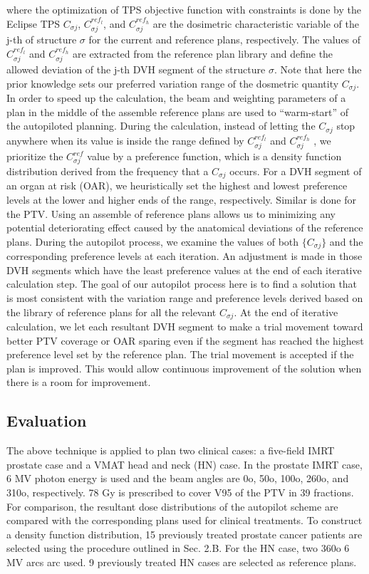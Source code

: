 where the optimization of TPS objective function with constraints is done by the Eclipse TPS $C_{\sigma j}$,  $C^{ref_{l}}_{\sigma j}$, and $C^{ref_{h}}_{\sigma j}$ are the dosimetric characteristic variable  of the j-th of structure $\sigma$ for the current and reference plans, respectively. The values of $C^{ref_{l}}_{\sigma j}$ and $C^{ref_{h}}_{\sigma j}$ are extracted from the reference plan library and define the allowed deviation of the j-th DVH segment of the structure $\sigma$. Note that here the prior knowledge sets our preferred variation range of the dosmetric quantity $C_{\sigma j}$. In order to speed up the calculation, the beam and weighting parameters of a plan in the middle of the assemble reference plans are used to ``warm-start'' of the autopiloted planning.  During the calculation, instead of letting the $C_{\sigma j}$  stop anywhere when its value is inside the range defined by $C^{ref_{l}}_{\sigma j}$ and $C^{ref_{h}}_{\sigma j}$ , we prioritize  the  $C^{ref}_{\sigma j}$ value by a preference function, which is a density function distribution derived from the frequency that a $C_{\sigma j}$  occurs. For a DVH segment of an organ at risk (OAR), we heuristically set the highest and lowest preference levels at the lower and higher ends of the range, respectively.  Similar is done for the PTV. Using an assemble of reference plans allows us to minimizing any potential deteriorating effect caused by the anatomical deviations of the reference plans. During the autopilot process, we examine the values of both $\{C_{\sigma j}\}$ and the corresponding preference levels at each iteration. An adjustment is made in those DVH segments which have the least preference values at the end of each iterative calculation step. The goal of our autopilot process here is to find a solution that is most consistent with the variation range and  preference levels derived based on the library of reference plans for all the relevant $C_{\sigma j}$.  At the end of iterative calculation, we let each resultant DVH segment to make a trial movement toward better PTV coverage or OAR sparing even if the segment has reached the highest preference level set by the reference plan. The trial movement is accepted if the plan is improved. This would allow continuous improvement of the solution when there is a room for improvement.

\subsection{Evaluation}
The above technique is applied to plan two clinical cases:  a five-field IMRT prostate case and a VMAT head and neck (HN) case. In the prostate IMRT case, 6 MV photon energy is used and the beam angles are 0o, 50o, 100o, 260o, and 310o, respectively. 78 Gy is prescribed to cover V95 of the PTV in 39 fractions.  For comparison, the resultant dose distributions of the autopilot scheme are compared with the corresponding plans used for clinical treatments. To construct a density function distribution, 15 previously treated prostate cancer patients are selected using the procedure outlined in Sec. 2.B.  For the HN case, two 360o 6 MV arcs arc used.  9 previously treated HN cases are selected as reference plans.

